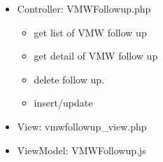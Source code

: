 \documentclass[letterpaper,10pt,english,openany,oneside]{sphinxmanual}
\begin{document}
\begin{sphinxVerbatim}[commandchars=\\\{\}]
                
  
                
\end{sphinxVerbatim}
\begin{itemize}
\item {} 
\sphinxAtStartPar
Controller: VMWFollowup.php
\begin{itemize}
\item {} 
\sphinxAtStartPar
{} get list of VMW follow up

\item {} 
\sphinxAtStartPar
{} get detail of VMW follow up

\item {} 
\sphinxAtStartPar
{} delete follow up.

\item {} 
\sphinxAtStartPar
{} insert/update

\end{itemize}

\begin{sphinxVerbatim}[commandchars=\\\{\}]
    
   
 
\end{sphinxVerbatim}

\item {} 
\sphinxAtStartPar
View: vmwfollowup\_view.php

\item {} 
\sphinxAtStartPar
ViewModel: VMWFollowup.js

\end{itemize}
\end{document}

